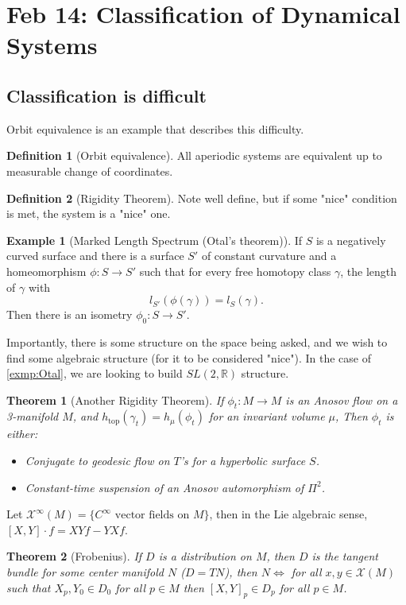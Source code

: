 \documentclass[psamsfonts]{amsart}
\newtheorem{thm}{Theorem}[section]
\theoremstyle{definition}
\newtheorem{defn}{Definition}[section]
\newtheorem{exmp}{Example}[section]
\numberwithin{equation}{section}
\newcommand{\R}{\mathbb{R}}
\begin{document}
\section{Feb 14: Classification of Dynamical Systems}
\subsection{Classification is difficult}
Orbit equivalence is an example that describes this difficulty.
\begin{defn}[Orbit equivalence]
    All aperiodic systems are equivalent up to measurable change of 
    coordinates.
\end{defn}
\begin{defn}[Rigidity Theorem]
    Note well define, but if some "nice" condition is met, the system is a "nice" one.
\end{defn}
\begin{exmp}[Marked Length Spectrum (Otal's theorem)]\label{exmp:Otal}
    If $S$ is a negatively curved surface and there is a surface $S'$ of constant curvature and a 
    homeomorphism $\phi: S\to S'$ such that for every free homotopy class $\gamma$, the length of $\gamma$ with 
    \[l_{S'}(\phi(\gamma)) = l_S(\gamma).\] Then there is an isometry $\phi_0 : S\to S'$.
\end{exmp}
Importantly, there is some structure on the space being asked, and we wish to find some algebraic structure (for it to be considered "nice"). In the case of \autoref{exmp:Otal}, we are looking to build
$SL(2,\R)$ structure.
\begin{thm}[Another Rigidity Theorem]
    If $\phi_t:M\to M$ is an Anosov flow on a 3-manifold $M$, and $h_{\text{top}}(\gamma_t) = h_\mu(\phi_t)$ for an invariant volume $\mu$, 
    Then $\phi_t$ is either:
    \begin{itemize}
        \item Conjugate to geodesic flow on $T$'s for a hyperbolic surface $S$.
        \item Constant-time suspension of an Anosov automorphism of $\Pi^2$.
    \end{itemize}
\end{thm}
Let $\mathcal{X}^\infty(M) = \{C^\infty \text{ vector fields on } M\}$, then in the Lie algebraic sense, $[X,Y]\cdot f = XYf - YXf$.
\begin{thm}[Frobenius]
    If $D$ is a distribution on $M$, then $D$ is the tangent bundle for some center manifold $N$ ($D =  TN$), then 
    $N\iff$ for all $x,y\in \mathcal{X}(M)$ such that $X_p,Y_0\in D_0$ for all $p\in M$ then $[X,Y]_p\in D_p$ for all $p\in M$.
\end{thm}
\end{document}
